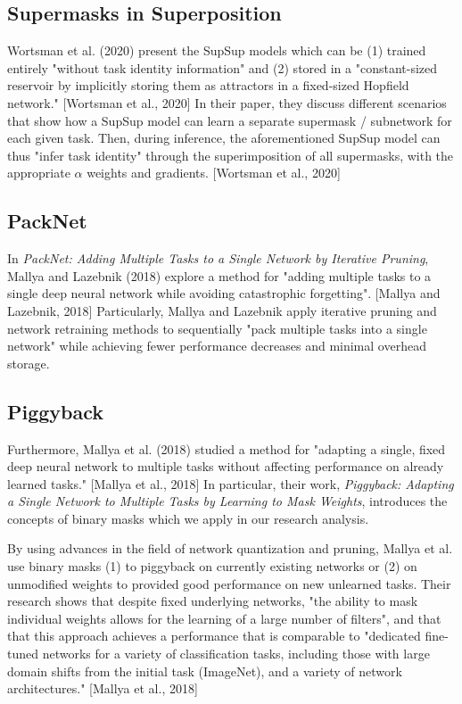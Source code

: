 \documentclass{article}
\begin{document}
\subsection{Supermasks in Superposition}
Wortsman et al. (2020) present the SupSup models which can be (1) trained entirely "without task identity information" and (2) stored in a "constant-sized reservoir by implicitly storing them as attractors in a fixed-sized Hopfield network." [Wortsman et al., 2020] In their paper, they discuss different scenarios that show how a SupSup model can learn a separate supermask / subnetwork for each given task. Then, during inference, the aforementioned SupSup model can thus "infer task identity" through the superimposition of all supermasks, with the appropriate $\alpha$ weights and gradients. [Wortsman et al., 2020]


\subsection{PackNet}
In \emph{PackNet: Adding Multiple Tasks to a Single Network by Iterative Pruning}, Mallya and Lazebnik (2018) explore a method for "adding multiple tasks to a single deep neural network while avoiding catastrophic forgetting". [Mallya and Lazebnik, 2018] Particularly, Mallya and Lazebnik apply iterative pruning and network retraining methods to sequentially "pack multiple tasks into a single network" while achieving fewer performance decreases and minimal overhead storage. 


\subsection{Piggyback}
Furthermore, Mallya et al. (2018) studied a method for "adapting a single, fixed deep neural network to multiple tasks without affecting performance on already learned tasks." [Mallya et al., 2018] In particular, their work, \emph{Piggyback: Adapting a Single Network to Multiple Tasks by Learning to Mask Weights}, introduces the concepts of binary masks which we apply in our research analysis. 

By using advances in the field of network quantization and pruning, Mallya et al. use binary masks (1) to piggyback on currently existing networks or (2) on unmodified weights to provided good performance on new unlearned tasks. Their research shows that despite fixed underlying networks, "the ability to mask individual weights allows for the learning of a large number of filters", and that that this approach achieves a performance that is comparable to "dedicated fine-tuned networks for a variety of classification tasks, including those with large domain shifts from the initial task (ImageNet), and a variety of network architectures." [Mallya et al., 2018]
\end{document}
